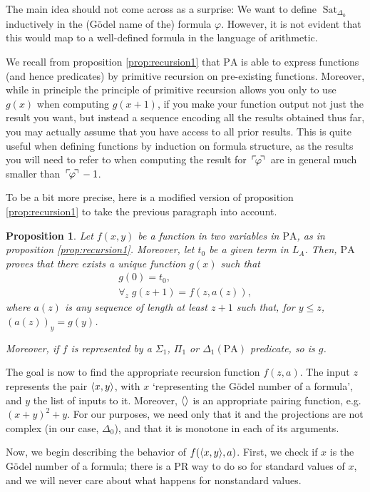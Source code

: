 \documentclass{article}
\newtheorem{prop}[theorem]{Proposition}
\theoremstyle{nonumberplain}
\newcommand{\LA}{L_A}
\newcommand{\PA}{\mathrm{PA}}
\DeclareMathOperator{\Sat}{Sat}
\DeclarePairedDelimiter{\braket}{\langle}{\rangle}
\newcommand{\gn}[1]{\setbox0=\hbox{$\mathclap{\phantom{t}}#1$} \dimen0=\ht0 \advance\dimen0 by -1.25ex \,\raise\dimen0\hbox{$\ulcorner$} \! \box0 \! \raise\dimen0\hbox{$\urcorner$}\,}
\begin{document}
The main idea should not come across as a surprise: We want to define $\Sat_{\Delta_0}$ inductively in the (Gödel name of the) formula $\varphi$. However, it is not evident that this would map to a well-defined formula in the language of arithmetic.

We recall from proposition \ref{prop:recursion1} that $\PA$ is able to express functions (and hence predicates) by primitive recursion on pre-existing functions. Moreover, while in principle the principle of primitive recursion allows you only to use $g(x)$ when computing $g(x+1)$, if you make your function output not just the result you want, but instead a sequence encoding all the results obtained thus far, you may actually assume that you have access to all prior results. This is quite useful when defining functions by induction on formula structure, as the results you will need to refer to when computing the result for $\gn\varphi$ are in general much smaller than $\gn\varphi - 1$.

To be a bit more precise, here is a modified version of proposition \ref{prop:recursion1} to take the previous paragraph into account.

\begin{prop}\label{prop:recursionacc}
Let $f(x, y)$ be a function in two variables in $\PA$, as in proposition \ref{prop:recursion1}. Moreover, let $t_0$ be a given term in $\LA$. Then, $\PA$ proves that there exists a unique function $g(x)$ such that
\begin{gather}
g(0) = t_0,\\
\forall_z \; g(z+1) = f(z, a(z)),
\end{gather}
where $a(z)$ is any sequence of length at least $z+1$ such that, for $y \leq z$, $(a(z))_y = g(y)$.

Moreover, if $f$ is represented by a $\Sigma_1$, $\Pi_1$ or $\Delta_1(\PA)$ predicate, so is $g$.
\end{prop}

The goal is now to find the appropriate recursion function $f(z,a)$. The input $z$ represents the pair $\braket{x,y}$, with $x$ `representing the Gödel number of a formula', and $y$ the list of inputs to it. Moreover, $\braket{}$ is an appropriate pairing function, e.g. $(x+y)^2 + y$. For our purposes, we need only that it and the projections are not complex (in our case, $\Delta_0$), and that it is monotone in each of its arguments.

Now, we begin describing the behavior of $f(\braket{x,y},a)$. First, we check if $x$ is the Gödel number of a formula; there is a PR way to do so for standard values of $x$, and we will never care about what happens for nonstandard values.
\end{document}
